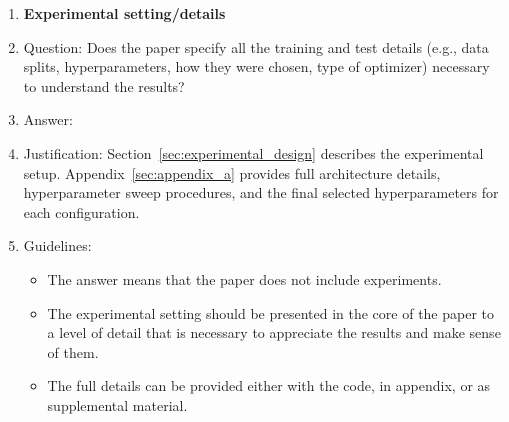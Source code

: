 \documentclass{article}
\begin{document}
\begin{enumerate}
\item {\bf Experimental setting/details}
    \item[] Question: Does the paper specify all the training and test details (e.g., data splits, hyperparameters, how they were chosen, type of optimizer) necessary to understand the results?
    \item[] Answer: \answerYes{}
    \item[] Justification: Section~\ref{sec:experimental_design} describes the experimental setup. Appendix~\ref{sec:appendix_a} provides full architecture details, hyperparameter sweep procedures, and the final selected hyperparameters for each configuration.
    \item[] Guidelines:
    \begin{itemize}
        \item The answer \answerNA{} means that the paper does not include experiments.
        \item The experimental setting should be presented in the core of the paper to a level of detail that is necessary to appreciate the results and make sense of them.
        \item The full details can be provided either with the code, in appendix, or as supplemental material.
    \end{itemize}


\end{enumerate}
\end{document}
